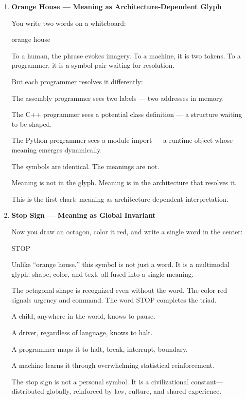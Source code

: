 \begin{enumerate}
\def\labelenumi{\arabic{enumi}.}
\item
  \textbf{Orange House --- Meaning as Architecture‑Dependent Glyph}

  You write two words on a whiteboard:

  orange house

  To a human, the phrase evokes imagery. To a machine, it is two tokens.
  To a programmer, it is a symbol pair waiting for resolution.

  But each programmer resolves it differently:

  The assembly programmer sees two labels --- two addresses in memory.

  The C++ programmer sees a potential class definition --- a structure
  waiting to be shaped.

  The Python programmer sees a module import --- a runtime object whose
  meaning emerges dynamically.

  The symbols are identical. The meanings are not.

  Meaning is not in the glyph. Meaning is in the architecture that
  resolves it.

  This is the first chart: meaning as architecture‑dependent
  interpretation.
\item
  \textbf{Stop Sign --- Meaning as Global Invariant}

  Now you draw an octagon, color it red, and write a single word in the
  center:

  STOP

  Unlike ``orange house,'' this symbol is not just a word. It is a
  multimodal glyph: shape, color, and text, all fused into a single
  meaning.

  The octagonal shape is recognized even without the word. The color red
  signals urgency and command. The word STOP completes the triad.

  A child, anywhere in the world, knows to pause.

  A driver, regardless of language, knows to halt.

  A programmer maps it to halt, break, interrupt, boundary.

  A machine learns it through overwhelming statistical reinforcement.

  The stop sign is not a personal symbol. It is a civilizational
  constant---distributed globally, reinforced by law, culture, and
  shared experience.


\end{enumerate}
